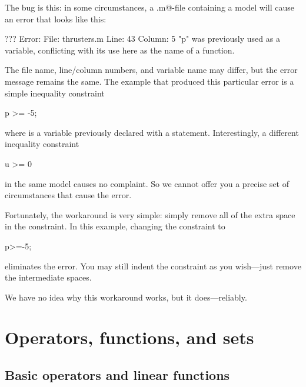 \documentclass[12pt]{article}
\begin{document}
The bug is this: in  some circumstances, a \verb@.m@-file containing a \cvx model will cause
an error that looks like this:
\begin{code}
	??? Error: File: thrusters.m Line: 43 Column: 5
	"p" was previously used as a variable,
	conflicting with its use here as the name of a function.
\end{code}
The file name, line/column numbers, and variable name may differ, 
but the error message remains the same. The example that produced this particular 
error is a simple inequality constraint
\begin{code}
	p >= -5;
\end{code}
where \verb@p@ is a \cvx variable previously declared with a \verb@variable@ statement.
Interestingly, a different inequality constraint
\begin{code}
	u >= 0
\end{code}
in the same model causes no complaint. So we cannot offer you a precise set
of circumstances that cause the error.

Fortunately, the workaround is very simple: simply remove all of the extra space
in the constraint. In this example, changing the constraint to
\begin{code}
	p>=-5;
\end{code}
eliminates the error. You may still indent the constraint as you wish---just
remove the intermediate spaces.

We have no idea why this workaround works, but it does---reliably.

\newpage
\section{Operators, functions, and sets}
\label{s-functions}

\subsection{Basic operators and linear functions}
\end{document}
